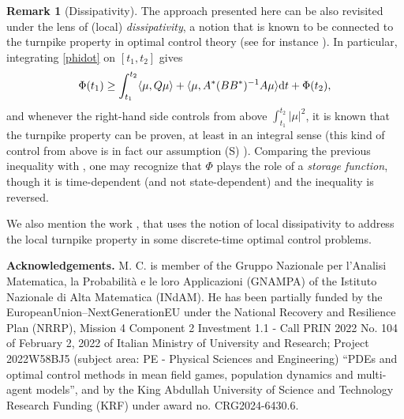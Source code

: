 \documentclass[10pt,a4paper,nouppercase,nowrite]{article}
\numberwithin{equation}{section}
\newcommand{\di}{{\rm d}}
\newcommand{\Sp}{{\textsc (S)} }
\theoremstyle{definition}
\newtheorem{rmk}[defn]{Remark}
\begin{document}
	
	\begin{rmk}[Dissipativity] The approach presented here can be also revisited under the lens of (local) \textit{dissipativity}, a notion that is known to be connected to the turnpike property in optimal control theory (see for instance \cite{TZh}). In particular, integrating \eqref{phidot} on $[t_1, t_2]$ gives
	\[
	\Phi(t_1) \ge \int_{t_1}^{t_2}\langle\mu, Q\mu\rangle  + \langle \mu, A^* (BB^*)^{-1}A \mu \rangle \di t + \Phi(t_2) ,
	\]
	and whenever the right-hand side controls from above $\int_{t_1}^{t_2} |\mu|^2$, it is known that the turnpike property can be proven, at least in an integral sense (this kind of control from above is in fact our assumption \Sp). Comparing the previous inequality with \cite[Definition 1]{TZh}, one may recognize that $\Phi$ plays the role of a \textit{storage function}, though it is time-dependent (and not state-dependent) and the inequality is reversed.
	
	We also mention the work \cite{KFG}, that uses the notion of local dissipativity to address the local turnpike property in some discrete-time optimal control problems.
	\end{rmk}
	
	\bigskip
	
	\textbf{Acknowledgements.} M. C. is member of the Gruppo Nazionale per l'Analisi Matematica, la Probabilit\`a e le loro Applicazioni (GNAMPA) of the Istituto Nazionale di Alta Matematica (INdAM). He has been partially funded by the EuropeanUnion–NextGenerationEU under the National Recovery and Resilience Plan (NRRP), Mission 4 Component 2 Investment 1.1 - Call PRIN 2022 No. 104 of February 2, 2022 of Italian Ministry of University and Research; Project 2022W58BJ5 (subject area: PE - Physical Sciences and Engineering) “PDEs and optimal control methods in mean field games, population dynamics and multi-agent models”, and by the King Abdullah University of Science and Technology Research Funding (KRF) under award no. CRG2024-6430.6.
\end{document}

